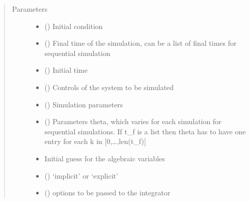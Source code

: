\documentclass[letterpaper,10pt,english]{sphinxmanual}
\begin{document}
\begin{fulllineitems}
\begin{fulllineitems}
\begin{description}
\end{description}
\begin{quote}\begin{description}
\item[{Parameters}] \leavevmode\begin{itemize}
\item {} 
 () \textendash{} Initial condition

\item {} 
 () \textendash{} Final time of the simulation, can be a list of final times for sequential simulation

\item {} 
 () \textendash{} Initial time

\item {} 
 () \textendash{} Controls of the system to be simulated

\item {} 
 () \textendash{} Simulation parameters

\item {} 
 () \textendash{} Parameters theta, which varies for each simulation for sequential simulations.
If t\_f is a list then theta has to have one entry for each k in {[}0,…,len(t\_f){]}

\item {} 
 \textendash{} Initial guess for the algebraic variables

\item {} 
 () \textendash{} ‘implicit’ or ‘explicit’

\item {} 
 () \textendash{} options to be passed to the integrator


\end{itemize}
\end{description}
\end{quote}
\end{fulllineitems}
\end{fulllineitems}
\end{document}
